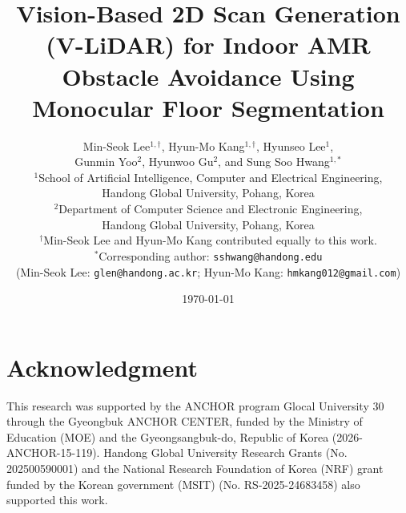 \documentclass[10pt,twocolumn,a4paper]{article}
\title{\textbf{Vision-Based 2D Scan Generation (V-LiDAR) for Indoor AMR Obstacle Avoidance Using Monocular Floor Segmentation}}
\author{
    Min-Seok Lee$^{1,\dagger}$, Hyun-Mo Kang$^{1,\dagger}$, Hyunseo Lee$^{1}$,\\
    Gunmin Yoo$^{2}$, Hyunwoo Gu$^{2}$, and Sung Soo Hwang$^{1,*}$\\[1ex]
    $^{1}$School of Artificial Intelligence, Computer and Electrical Engineering,\\
    Handong Global University, Pohang, Korea\\
    $^{2}$Department of Computer Science and Electronic Engineering,\\
    Handong Global University, Pohang, Korea\\[1ex]
    $^{\dagger}$Min-Seok Lee and Hyun-Mo Kang contributed equally to this work.\\
    $^{*}$Corresponding author: \texttt{sshwang@handong.edu}\\
    (Min-Seok Lee: \texttt{glen@handong.ac.kr}; Hyun-Mo Kang: \texttt{hmkang012@gmail.com})
}
\date{\today}
\begin{document}
\maketitle









\section*{Acknowledgment}
This research was supported by the ANCHOR program Glocal University 30 through the Gyeongbuk ANCHOR CENTER, funded by the Ministry of Education (MOE) and the Gyeongsangbuk-do, Republic of Korea (2026-ANCHOR-15-119). Handong Global University Research Grants (No. 202500590001) and the National Research Foundation of Korea (NRF) grant funded by the Korean government (MSIT) (No. RS-2025-24683458) also supported this work.



\end{document}
